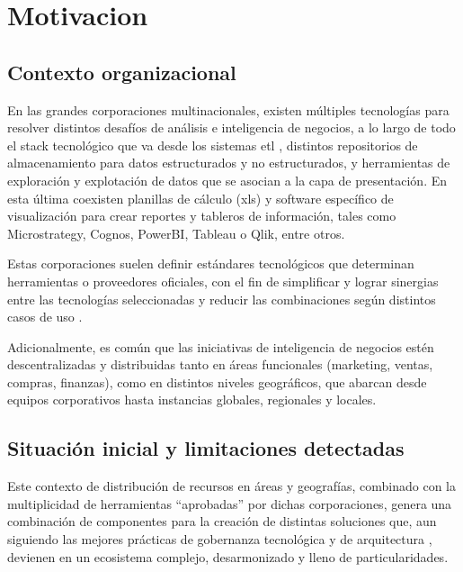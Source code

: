 \chapter{Motivacion}

\section{Contexto organizacional}

En las grandes corporaciones multinacionales, existen múltiples tecnologías para resolver distintos desafíos de análisis e inteligencia de negocios, a lo largo de todo el stack tecnológico que va desde los sistemas \gls{etl} \cite{inmon1992}, distintos repositorios de almacenamiento para datos estructurados y no estructurados, y herramientas de exploración y explotación de datos que se asocian a la capa de presentación. En esta última coexisten planillas de cálculo (xls) y software específico de visualización para crear reportes y tableros de información, tales como Microstrategy, Cognos, PowerBI, Tableau o Qlik, entre otros.

Estas corporaciones suelen definir estándares tecnológicos que determinan herramientas o proveedores oficiales, con el fin de simplificar y lograr sinergias entre las tecnologías seleccionadas y reducir las combinaciones según distintos casos de uso \cite{jacobson1986}.

Adicionalmente, es común que las iniciativas de inteligencia de negocios estén descentralizadas y distribuidas tanto en áreas funcionales (marketing, ventas, compras, finanzas), como en distintos niveles geográficos, que abarcan desde equipos corporativos hasta instancias globales, regionales y locales.

\section{Situación inicial y limitaciones detectadas}

Este contexto de distribución de recursos en áreas y geografías, combinado con la multiplicidad de herramientas “aprobadas” por dichas corporaciones, genera una combinación de componentes para la creación de distintas soluciones que, aun siguiendo las mejores prácticas de gobernanza tecnológica y de arquitectura \cite{isaca2012}, devienen en un ecosistema complejo, desarmonizado y lleno de particularidades.

